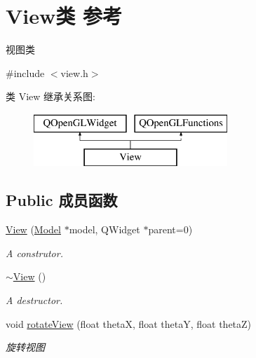\hypertarget{class_view}{}\section{View类 参考}
\label{class_view}


视图类  




{\ttfamily \#include $<$view.\+h$>$}

类 View 继承关系图\+:\begin{figure}[H]
\begin{center}
\leavevmode
\includegraphics[height=2.000000cm]{class_view}
\end{center}
\end{figure}
\subsection*{Public 成员函数}
\begin{DoxyCompactItemize}
\item 
\hypertarget{class_view_a23bf47b5e5888e35781307cc7507181f}{}\hyperlink{class_view_a23bf47b5e5888e35781307cc7507181f}{View} (\hyperlink{class_model}{Model} $\ast$model, Q\+Widget $\ast$parent=0)\label{class_view_a23bf47b5e5888e35781307cc7507181f}

\begin{DoxyCompactList}\small\item\em A construtor. \end{DoxyCompactList}\item 
\hypertarget{class_view_ad0dc854db9aabbea98a334dec89f785c}{}\hyperlink{class_view_ad0dc854db9aabbea98a334dec89f785c}{$\sim$\+View} ()\label{class_view_ad0dc854db9aabbea98a334dec89f785c}

\begin{DoxyCompactList}\small\item\em A destructor. \end{DoxyCompactList}\item 
void \hyperlink{class_view_a647f520f9b348ce40bfcd9cd1969d3b2}{rotate\+View} (float theta\+X, float theta\+Y, float theta\+Z)
\begin{DoxyCompactList}\small\item\em 旋转视图 \end{DoxyCompactList}\end{DoxyCompactItemize}
